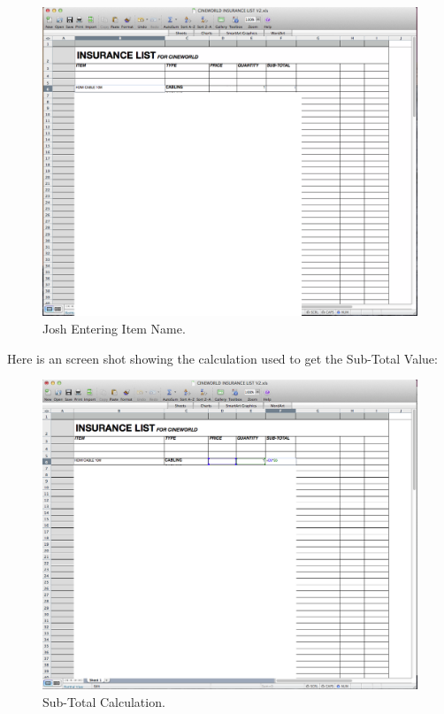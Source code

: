 \begin{figure}[H]
    \includegraphics[width=\textwidth]{./Analysis/Forms/enter_data.png}
    \caption{Josh Entering Item Name.} \label{fig:print_function_result}
\end{figure}

\newpage

\noindent Here is an screen shot showing the calculation used to get the Sub-Total Value:

\begin{figure}[H]
    \includegraphics[width=\textwidth]{./Analysis/Forms/sub_total_calc.png}
    \caption{Sub-Total Calculation.} \label{fig:print_function_result}
\end{figure}

